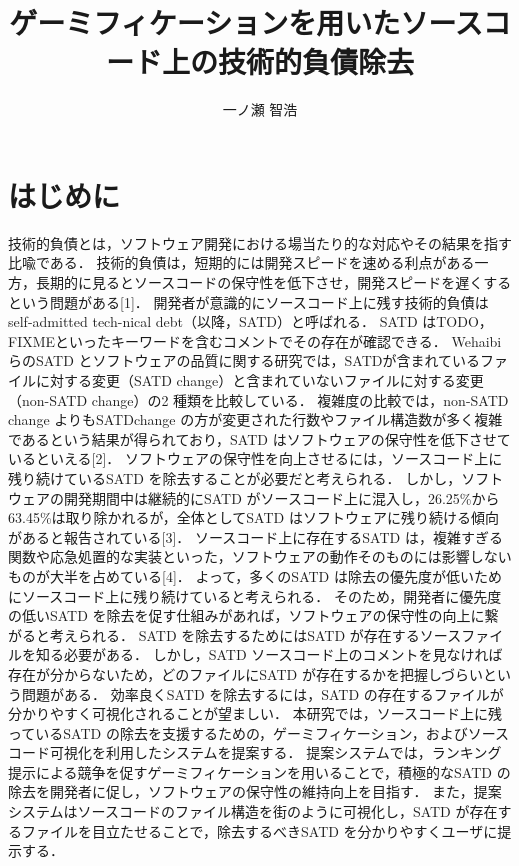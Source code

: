 \documentclass[12pt]{jarticle} %
\title{ゲーミフィケーションを用いたソースコード上の技術的負債除去}
\author{一ノ瀬 智浩}
\begin{document}
%
%
\titlepage
\cmemberspage
\firstabstract
\secondabstract
%
%
\toc
\newpage
\listoffigures
\listoftables
%
%

\newpage
\section{はじめに}

技術的負債とは，ソフトウェア開発における場当たり的な対応やその結果を指す比喩である．
技術的負債は，短期的には開発スピードを速める利点がある一方，長期的に見るとソースコードの保守性を低下させ，開発スピードを遅くするという問題がある[1]．
開発者が意識的にソースコード上に残す技術的負債はself-admitted tech-nical debt（以降，SATD）と呼ばれる．
SATD はTODO，FIXMEといったキーワードを含むコメントでその存在が確認できる．
Wehaibi らのSATD とソフトウェアの品質に関する研究では，SATDが含まれているファイルに対する変更（SATD change）と含まれていないファイルに対する変更（non-SATD change）の2 種類を比較している．
複雑度の比較では，non-SATD change よりもSATDchange の方が変更された行数やファイル構造数が多く複雑であるという結果が得られており，SATD はソフトウェアの保守性を低下させているといえる[2]．
ソフトウェアの保守性を向上させるには，ソースコード上に残り続けているSATD を除去することが必要だと考えられる．
しかし，ソフトウェアの開発期間中は継続的にSATD がソースコード上に混入し，26.25\%から63.45\%は取り除かれるが，全体としてSATD はソフトウェアに残り続ける傾向があると報告されている[3]．
ソースコード上に存在するSATD は，複雑すぎる関数や応急処置的な実装といった，ソフトウェアの動作そのものには影響しないものが大半を占めている[4]．
よって，多くのSATD は除去の優先度が低いためにソースコード上に残り続けていると考えられる．
そのため，開発者に優先度の低いSATD を除去を促す仕組みがあれば，ソフトウェアの保守性の向上に繋がると考えられる．
SATD を除去するためにはSATD が存在するソースファイルを知る必要がある．
しかし，SATD ソースコード上のコメントを見なければ存在が分からないため，どのファイルにSATD が存在するかを把握しづらいという問題がある．
効率良くSATD を除去するには，SATD の存在するファイルが分かりやすく可視化されることが望ましい．
本研究では，ソースコード上に残っているSATD の除去を支援するための，ゲーミフィケーション，およびソースコード可視化を利用したシステムを提案する．
提案システムでは，ランキング提示による競争を促すゲーミフィケーションを用いることで，積極的なSATD の除去を開発者に促し，ソフトウェアの保守性の維持向上を目指す．
また，提案システムはソースコードのファイル構造を街のように可視化し，SATD が存在するファイルを目立たせることで，除去するべきSATD を分かりやすくユーザに提示する．
\end{document}
